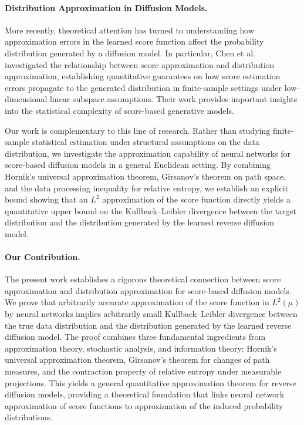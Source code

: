 \documentclass[11pt]{article}
\begin{document}
\paragraph{Distribution Approximation in Diffusion Models.}

More recently, theoretical attention has turned to understanding how
approximation errors in the learned score function affect the probability
distribution generated by a diffusion model. In particular, Chen et
al.~\cite{Chen2023ScoreAE} investigated the relationship between score
approximation and distribution approximation, establishing quantitative
guarantees on how score estimation errors propagate to the generated
distribution in finite-sample settings under low-dimensional linear
subspace assumptions. Their work provides important insights into the
statistical complexity of score-based generative models.

Our work is complementary to this line of research. Rather than studying
finite-sample statistical estimation under structural assumptions on the
data distribution, we investigate the approximation capability of neural
networks for score-based diffusion models in a general Euclidean setting.
By combining Hornik's universal approximation theorem, Girsanov's theorem
on path space, and the data processing inequality for relative entropy,
we establish an explicit bound showing that an $L^2$ approximation of the
score function directly yields a quantitative upper bound on the
Kullback--Leibler divergence between the target distribution and the
distribution generated by the learned reverse diffusion model.



\paragraph{Our Contribution.}
The present work establishes a rigorous theoretical connection between score
approximation and distribution approximation for score-based diffusion models.
We prove that arbitrarily accurate approximation of the score function in
$L^2(\mu)$ by neural networks implies arbitrarily small
Kullback--Leibler divergence between the true data distribution and the
distribution generated by the learned reverse diffusion model. The proof
combines three fundamental ingredients from approximation theory,
stochastic analysis, and information theory: Hornik's universal approximation
theorem, Girsanov's theorem for changes of path measures, and the contraction
property of relative entropy under measurable projections. This yields a
general quantitative approximation theorem for reverse diffusion models,
providing a theoretical foundation that links neural network approximation of
score functions to approximation of the induced probability distributions.
\end{document}
